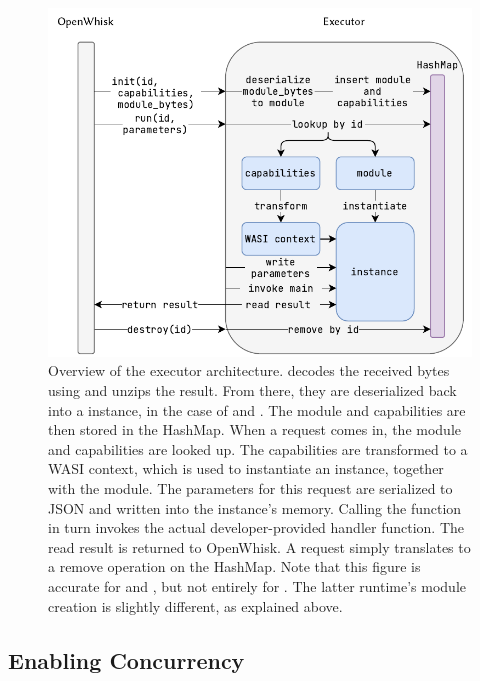 \begin{figure}[ht!]
    \centering
    \includegraphics{figures/ExecutorOverview.pdf}
    \caption{Overview of the executor architecture.  decodes the received bytes using  and unzips the result. From there, they are deserialized back into a  instance, in the case of  and . The module and capabilities are then stored in the HashMap. When a  request comes in, the module and capabilities are looked up. The capabilities are transformed to a WASI context, which is used to instantiate an instance, together with the module. The parameters for this  request are serialized to JSON and written into the instance's memory. Calling the  function in turn invokes the actual developer-provided handler function. The read result is returned to OpenWhisk. A  request simply translates to a remove operation on the HashMap. Note that this figure is accurate for  and , but not entirely for . The latter runtime's module creation is slightly different, as explained above.}
    \label{fig:executor-overview}
\end{figure}



\subsection{Enabling Concurrency}
\label{section:enabling-concurrency}

